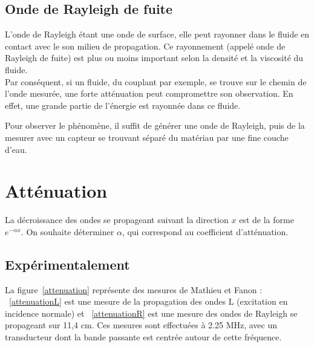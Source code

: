 \documentclass[twoside]{article}
\begin{document}
\begin{multicols}{2}
\subsection{Onde de Rayleigh de fuite}

L'onde de Rayleigh étant une onde de surface, elle peut rayonner dans le fluide en contact avec le son milieu de propagation. Ce rayonnement (appelé onde de Rayleigh de fuite) est plus ou moins important selon la densité et la viscosité du fluide. \\

Par conséquent, si un fluide, du couplant par exemple, se trouve sur le chemin de l'onde mesurée, une forte atténuation peut compromettre son observation. En effet, une grande partie de l'énergie est rayonnée dans ce fluide.

Pour observer le phénomène, il suffit de générer une onde de Rayleigh, puis de la mesurer avec un capteur se trouvant séparé du matériau par une fine couche d'eau. 


\section{Atténuation}
La décroissance des ondes se propageant suivant la direction $x$ est de la forme $e^{-\alpha x}$. On souhaite déterminer $\alpha$, qui correspond au coefficient d'atténuation.

\subsection{Expérimentalement}
La figure~\ref{attenuation} représente des mesures de Mathieu et Fanon : ~\ref{attenuationL} est une mesure de la propagation des ondes L (excitation en incidence normale) et ~\ref{attenuationR} est une mesure des ondes de Rayleigh se propageant sur 11,4 cm. Ces mesures sont effectuées à 2.25 MHz, avec un transducteur dont la bande passante est centrée autour de cette fréquence.



\end{multicols}
\end{document}
